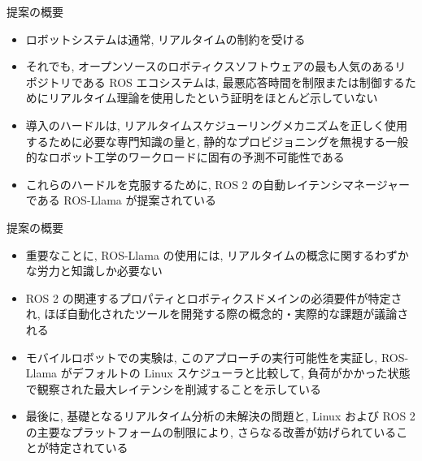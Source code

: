 
\begin{frame}{提案の概要}
    \begin{itemize}
        \item  ロボットシステムは通常, リアルタイムの制約を受ける
        \item それでも, オープンソースのロボティクスソフトウェアの最も人気のあるリポジトリである ROS エコシステムは, 最悪応答時間を制限または制御するためにリアルタイム理論を使用したという証明をほとんど示していない
        \item 導入のハードルは, リアルタイムスケジューリングメカニズムを正しく使用するために必要な専門知識の量と, 静的なプロビジョニングを無視する一般的なロボット工学のワークロードに固有の予測不可能性である
        \item これらのハードルを克服するために, ROS 2 の自動レイテンシマネージャーである ROS-Llama が提案されている
    \end{itemize}
\end{frame}

\begin{frame}{提案の概要}
    \begin{itemize}
        \item 重要なことに, ROS-Llama の使用には, リアルタイムの概念に関するわずかな労力と知識しか必要ない
        \item ROS 2 の関連するプロパティとロボティクスドメインの必須要件が特定され, ほぼ自動化されたツールを開発する際の概念的・実際的な課題が議論される
        \item モバイルロボットでの実験は, このアプローチの実行可能性を実証し, ROS-Llama がデフォルトの Linux スケジューラと比較して, 負荷がかかった状態で観察された最大レイテンシを削減することを示している
        \item 最後に, 基礎となるリアルタイム分析の未解決の問題と, Linux および ROS 2 の主要なプラットフォームの制限により, さらなる改善が妨げられていることが特定されている
    \end{itemize}
\end{frame}
